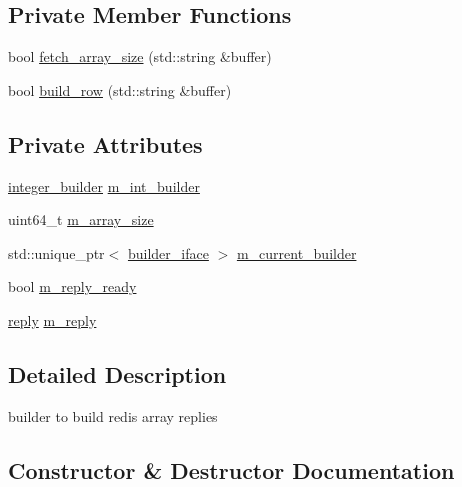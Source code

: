\subsection*{Private Member Functions}
\begin{DoxyCompactItemize}
\item 
bool \hyperlink{classcpp__redis_1_1builders_1_1array__builder_a1592420664b191c9133ed364fcb40aa0}{fetch\+\_\+array\+\_\+size} (std\+::string \&buffer)
\item 
bool \hyperlink{classcpp__redis_1_1builders_1_1array__builder_a89c6df1f961723051f3338bdd54a6a9f}{build\+\_\+row} (std\+::string \&buffer)
\end{DoxyCompactItemize}
\subsection*{Private Attributes}
\begin{DoxyCompactItemize}
\item 
\hyperlink{classcpp__redis_1_1builders_1_1integer__builder}{integer\+\_\+builder} \hyperlink{classcpp__redis_1_1builders_1_1array__builder_ac6bafe30792cf577dcb935872056e202}{m\+\_\+int\+\_\+builder}
\item 
uint64\+\_\+t \hyperlink{classcpp__redis_1_1builders_1_1array__builder_a980dc47bd2821608b6399ecf2972262f}{m\+\_\+array\+\_\+size}
\item 
std\+::unique\+\_\+ptr$<$ \hyperlink{classcpp__redis_1_1builders_1_1builder__iface}{builder\+\_\+iface} $>$ \hyperlink{classcpp__redis_1_1builders_1_1array__builder_a6efd7cea5b52fa7750a76906ce520948}{m\+\_\+current\+\_\+builder}
\item 
bool \hyperlink{classcpp__redis_1_1builders_1_1array__builder_ae3b3164237244adc58ffe1fb94946899}{m\+\_\+reply\+\_\+ready}
\item 
\hyperlink{classcpp__redis_1_1reply}{reply} \hyperlink{classcpp__redis_1_1builders_1_1array__builder_a0250a43d8954e282464805b490a6585f}{m\+\_\+reply}
\end{DoxyCompactItemize}


\subsection{Detailed Description}
builder to build redis array replies 

\subsection{Constructor \& Destructor Documentation}
\mbox{\label{classcpp__redis_1_1builders_1_1array__builder_a4beae33a547d3d7efc112659411a23a3}} 
